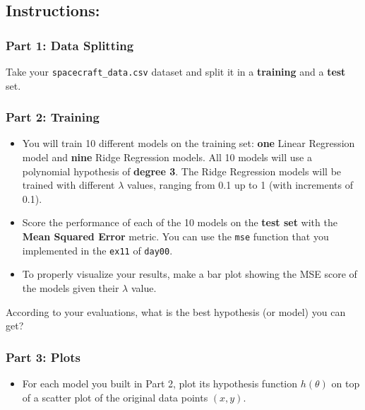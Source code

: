 \documentclass[]{article}
\providecommand{\tightlist}{%
  \setlength{\itemsep}{0pt}\setlength{\parskip}{0pt}}
\begin{document}
\hypertarget{instructions-9}{%
\subsection{Instructions:}\label{instructions-9}}

\hypertarget{part-1-data-splitting}{%
\subsubsection{Part 1: Data Splitting}\label{part-1-data-splitting}}

Take your \texttt{spacecraft\_data.csv} dataset and split it in a
\textbf{training} and a \textbf{test} set.

\hypertarget{part-2-training}{%
\subsubsection{Part 2: Training}\label{part-2-training}}

\begin{itemize}
\item
  You will train 10 different models on the training set: \textbf{one}
  Linear Regression model and \textbf{nine} Ridge Regression models. All
  10 models will use a polynomial hypothesis of \textbf{degree 3}. The
  Ridge Regression models will be trained with different \(\lambda\)
  values, ranging from 0.1 up to 1 (with increments of 0.1).
\item
  Score the performance of each of the 10 models on the \textbf{test
  set} with the \textbf{Mean Squared Error} metric. You can use the
  \texttt{mse} function that you implemented in the \texttt{ex11} of
  \texttt{day00}.
\item
  To properly visualize your results, make a bar plot showing the MSE
  score of the models given their \(\lambda\) value.
\end{itemize}

According to your evaluations, what is the best hypothesis (or model)
you can get?

\hypertarget{part-3-plots}{%
\subsubsection{Part 3: Plots}\label{part-3-plots}}

\begin{itemize}
\tightlist
\item
  For each model you built in Part 2, plot its hypothesis function
  \(h(\theta)\) on top of a scatter plot of the original data points
  \((x,y)\). \clearpage
\end{itemize}
\end{document}
